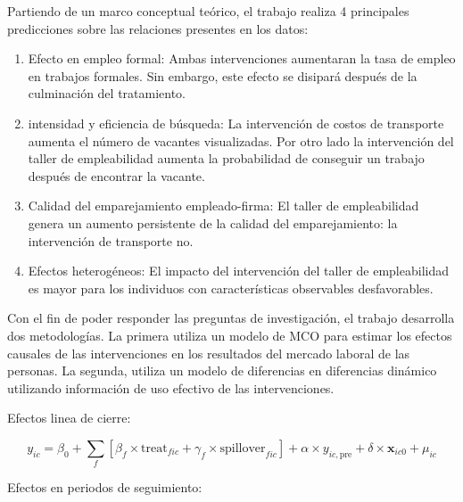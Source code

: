 \documentclass{article}
\begin{document}
    \medskip
    
    Partiendo de un marco conceptual teórico, el trabajo realiza 4 principales predicciones sobre las relaciones presentes en los datos:
    
    \begin{enumerate}
    
        \item Efecto en empleo formal: Ambas intervenciones aumentaran la tasa de empleo en trabajos formales. Sin embargo, este efecto se disipará después de la culminación del tratamiento.
        
        \item intensidad y eficiencia de búsqueda: La intervención de costos de transporte aumenta el número de vacantes visualizadas. Por otro lado la intervención del taller de empleabilidad aumenta la probabilidad de conseguir un trabajo después de encontrar la vacante. 
        
        \item Calidad del emparejamiento empleado-firma: El taller de empleabilidad genera un aumento persistente de la calidad del emparejamiento: la intervención de transporte no.
        
        \item Efectos heterogéneos: El impacto del intervención del taller de empleabilidad es mayor para los individuos con características observables desfavorables.
        
    \end{enumerate}
    
    \noindent Con el fin de poder responder las preguntas de investigación, el trabajo desarrolla dos metodologías. La primera utiliza un modelo de MCO para estimar los efectos causales de las intervenciones en los resultados del mercado laboral de las personas. La segunda, utiliza un modelo de diferencias en diferencias dinámico utilizando información de uso efectivo de las intervenciones.
    
    
    \medskip
    
    Efectos linea de cierre:
    
    \begin{equation}
        y_{ic} = \beta_0 + \sum_{f}\left[\beta_f\times \text{treat}_{fic} + \gamma_f\times\text{spillover}_{fic}\right] +\alpha \times y_{ic,\text{pre}} + \delta\times \mathbf{x}_{ic0} + \mu_{ic} \label{eq:main}
    \end{equation}
    
    Efectos en periodos de seguimiento:
    
\end{document}
